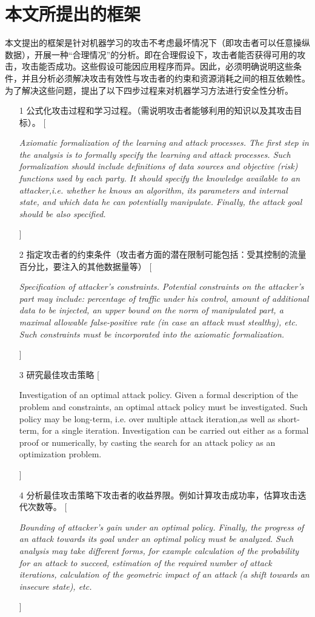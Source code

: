\documentclass[UTF8]{ctexart}
\begin{document}
    \section{本文所提出的框架}\label{sec:dierjie}
	本文提出的框架是针对机器学习的攻击不考虑最坏情况下（即攻击者可以任意操纵数据），开展一种“合理情况”的分析。即在合理假设下，攻击者能否获得可用的攻击，攻击能否成功。这些假设可能因应用程序而异。因此，必须明确说明这些条件，并且分析必须解决攻击有效性与攻击者的约束和资源消耗之间的相互依赖性。为了解决这些问题，提出了以下四步过程来对机器学习方法进行安全性分析。
	\begin{itemize}
	\item[1] 公式化攻击过程和学习过程。（需说明攻击者能够利用的知识以及其攻击目标）。
	[\begin{upshape} \itshape Axiomatic formalization of the learning and attack processes. The first step in the analysis is to formally specify the learning and attack processes. Such formalization should include definitions of data sources and objective (risk) functions used by each party. It should specify the knowledge available to an attacker,i.e. whether he knows an algorithm, its parameters and internal state, and which data he can potentially manipulate. Finally, the attack goal should be also specified. \end{upshape}]
	\item[2] 指定攻击者的约束条件（攻击者方面的潜在限制可能包括：受其控制的流量百分比，要注入的其他数据量等）
	[\begin{upshape} \itshape Specification of attacker’s constraints. Potential constraints on the attacker’s part may include: percentage
	of traffic under his control, amount of additional data to be injected, an upper bound on the norm of manipulated part, a maximal allowable false-positive rate (in case an attack must stealthy), etc. Such constraints must be incorporated into the axiomatic formalization.\end{upshape}]
	\item[3] 研究最佳攻击策略
	[\begin{upshape} Investigation of an optimal attack policy. Given a formal description of the problem and constraints, an optimal attack policy must be investigated. Such policy may be long-term, i.e. over multiple attack iteration,as well as short-term, for a single iteration. Investigation can be carried out either as a formal proof or numerically, by casting the search for an attack policy as an optimization problem. \itshape \end{upshape}]
	\item[4] 分析最佳攻击策略下攻击者的收益界限。例如计算攻击成功率，估算攻击迭代次数等。
	[\begin{upshape} \itshape  Bounding of attacker’s gain under an optimal policy. Finally, the progress of an attack towards its goal under an optimal policy must be analyzed. Such analysis may take different forms, for example calculation of the probability for an attack to succeed, estimation of the required number of attack iterations, calculation of the geometric impact of an attack (a shift towards an insecure state), etc.\end{upshape}]
	\end{itemize}
\end{document}
